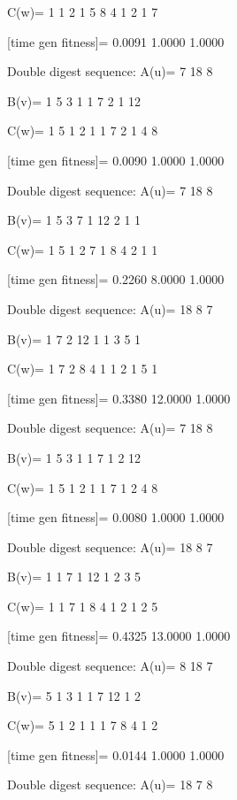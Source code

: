 C(w)=
     1     1     2     1     5     8     4     1     2     1     7

[time gen fitness]=
    0.0091    1.0000    1.0000

Double digest sequence:
A(u)=
     7    18     8

B(v)=
     1     5     3     1     1     7     2     1    12

C(w)=
     1     5     1     2     1     1     7     2     1     4     8

[time gen fitness]=
    0.0090    1.0000    1.0000

Double digest sequence:
A(u)=
     7    18     8

B(v)=
     1     5     3     7     1    12     2     1     1

C(w)=
     1     5     1     2     7     1     8     4     2     1     1

[time gen fitness]=
    0.2260    8.0000    1.0000

Double digest sequence:
A(u)=
    18     8     7

B(v)=
     1     7     2    12     1     1     3     5     1

C(w)=
     1     7     2     8     4     1     1     2     1     5     1

[time gen fitness]=
    0.3380   12.0000    1.0000

Double digest sequence:
A(u)=
     7    18     8

B(v)=
     1     5     3     1     1     7     1     2    12

C(w)=
     1     5     1     2     1     1     7     1     2     4     8

[time gen fitness]=
    0.0080    1.0000    1.0000

Double digest sequence:
A(u)=
    18     8     7

B(v)=
     1     1     7     1    12     1     2     3     5

C(w)=
     1     1     7     1     8     4     1     2     1     2     5

[time gen fitness]=
    0.4325   13.0000    1.0000

Double digest sequence:
A(u)=
     8    18     7

B(v)=
     5     1     3     1     1     7    12     1     2

C(w)=
     5     1     2     1     1     1     7     8     4     1     2

[time gen fitness]=
    0.0144    1.0000    1.0000

Double digest sequence:
A(u)=
    18     7     8

